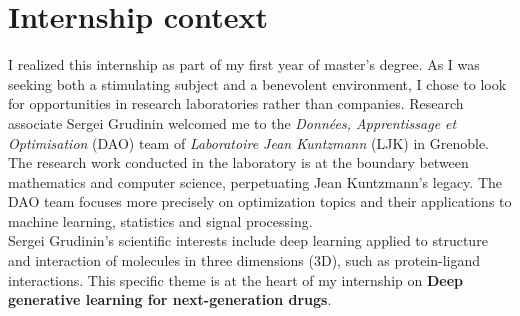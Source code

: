\documentclass{article}
\begin{document}
\newpage

\tableofcontents
\newpage

\section{Internship context}

I realized this internship as part of my first year of master's degree. As I was seeking both a stimulating subject and a benevolent environment, I chose to look for opportunities in research laboratories rather than companies. Research associate Sergei Grudinin welcomed me to the \textit{Données, Apprentissage et Optimisation} (DAO) team of \textit{Laboratoire Jean Kuntzmann} (LJK) in Grenoble. The research work conducted in the laboratory is at the boundary between mathematics and computer science, perpetuating Jean Kuntzmann's legacy. The DAO team focuses more precisely on optimization topics and their applications to machine learning, statistics and signal processing. \\
Sergei Grudinin's scientific interests include deep learning applied to structure and interaction of molecules in three dimensions (3D), such as protein-ligand interactions. This specific theme is at the heart of my internship on \textbf{Deep generative learning for next-generation drugs}. \\
\end{document}
